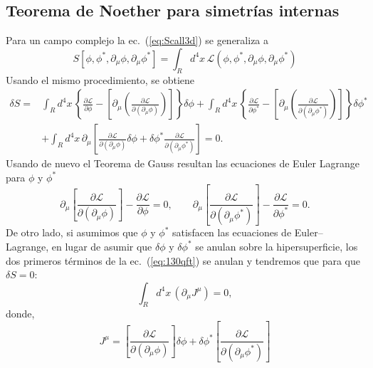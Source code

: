 \subsection{Teorema de Noether para simetrías internas}
Para un campo complejo la ec.~(\ref{eq:Scall3d}) se generaliza a
\begin{equation}
  S[\phi,\phi^*,\partial_\mu\phi,\partial_\mu\phi^*]=\int_{R}d^4x\,\mathcal{L}(\phi,\phi^*,\partial_\mu\phi,\partial_\mu\phi^*)
\end{equation}
Usando el mismo procedimiento, se obtiene
\begin{align}
  \label{eq:130qft}
   \delta S=&\int_{R}d^4x\,
  \left\{ 
    \frac{\partial\mathcal{L}}{\partial\phi}-
  \left[\partial_\mu\left(
      \frac{\partial\mathcal{L}}{\partial(\partial_\mu\phi)}
    \right)\right]
  \right\}\delta\phi
+\int_{R}d^4x\,
  \left\{ 
    \frac{\partial\mathcal{L}}{\partial\phi^*}-
  \left[\partial_\mu\left(
      \frac{\partial\mathcal{L}}{\partial(\partial_\mu\phi^*)}
    \right)\right]
  \right\}\delta\phi^*\nonumber\\
&+\int_{R}d^4x\,
    \partial_\mu\left[
      \frac{\partial\mathcal{L}}{\partial(\partial_\mu\phi)}\delta\phi+
      \delta\phi^*\frac{\partial\mathcal{L}}{\partial(\partial_\mu\phi^*)}
    \right]=0.
\end{align}
Usando de nuevo el Teorema de Gauss resultan las ecuaciones de Euler Lagrange para $\phi$ y $\phi^*$
\begin{equation}
\label{eq:132qft}
  \partial_\mu
  \left[
    \frac{\partial\mathcal{L}}{\partial
      (\partial_\mu\phi)}
  \right]-\frac{\partial\mathcal{L}}{\partial\phi}=0, \qquad
  \partial_\mu
  \left[
    \frac{\partial\mathcal{L}}{\partial
      (\partial_\mu\phi^*)}
  \right]-\frac{\partial\mathcal{L}}{\partial\phi^*}=0.
\end{equation}
De otro lado, si asumimos que $\phi$ y $\phi^*$ satisfacen las ecuaciones de Euler--Lagrange, en lugar de asumir que $\delta\phi$ y $\delta\phi^*$ se anulan sobre la hipersuperficie, los dos primeros términos de la ec.~(\ref{eq:130qft}) se anulan y tendremos que para que $\delta S=0$:
\begin{equation}
  \label{eq:jmu}
  \int_{R}d^4x\,(\partial_\mu J^\mu)=0,
\end{equation}
donde,
\begin{equation}
  \label{eq:jmuphi}
 J^\mu= \left[
      \frac{\partial\mathcal{L}}{\partial(\partial_\mu\phi)}
    \right]\delta\phi+\delta\phi^*\left[
      \frac{\partial\mathcal{L}}{\partial(\partial_\mu\phi^*)}
    \right]
\end{equation}

